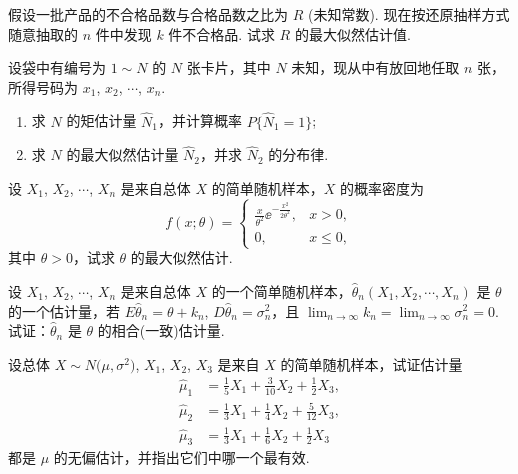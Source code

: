 	\begin{titwo}
		假设一批产品的不合格品数与合格品数之比为 $R$ (未知常数). 现在按还原抽样方式随意抽取的 $n$ 件中发现 $k$ 件不合格品. 试求 $R$ 的最大似然估计值.
	\end{titwo}

	\begin{titwo}
		设袋中有编号为 $1 \sim N$ 的 $N$ 张卡片，其中 $N$ 未知，现从中有放回地任取 $n$ 张，所得号码为 $x_{1}$, $x_{2}$, $\cdots$, $x_{n}$.
		\begin{enumerate}
			\item 求 $N$ 的矩估计量 $\hat N_{1}$，并计算概率 $P\bigl\{ \hat N_{1} = 1 \bigr\}$;
			\item 求 $N$ 的最大似然估计量 $\hat N_{2}$，并求 $\hat N_{2}$ 的分布律.
		\end{enumerate}
	\end{titwo}

	\begin{titwo}
		设 $X_{1}$, $X_{2}$, $\cdots$, $X_{n}$ 是来自总体 $X$ 的简单随机样本，$X$ 的概率密度为
		\[
			f(x;\theta) = \begin{cases}
				\frac{x}{\theta^{2}} \ee^{ - \frac{x^{2}}{2 \theta^{2}} }, & x > 0, \\
				0, & x \leq 0,
			\end{cases}
		\]
		其中 $\theta > 0$，试求 $\theta$ 的最大似然估计.
	\end{titwo}

	\begin{titwo}
		设 $X_{1}$, $X_{2}$, $\cdots$, $X_{n}$ 是来自总体 $X$ 的一个简单随机样本，$\hat \theta_{n}(X_{1},X_{2},\cdots,X_{n})$ 是 $\theta$ 的一个估计量，若 $E\hat \theta_{n} = \theta + k_{n}$, $D\hat \theta_{n} = \sigma_{n}^{2}$，且 $\lim_{n \to \infty} k_{n} = \lim_{n \to \infty} \sigma_{n}^{2} = 0$. 试证：$\hat \theta_{n}$ 是 $\theta$ 的相合(一致)估计量.
	\end{titwo}

	\begin{titwo}
		设总体 $X \sim N\bigl( \mu,\sigma^{2} \bigr)$, $X_{1}$, $X_{2}$, $X_{3}$ 是来自 $X$ 的简单随机样本，试证估计量
		\begin{align*}
			\hat \mu_{1} &= \frac{1}{5} X_{1} + \frac{3}{10} X_{2} + \frac{1}{2} X_{3}, \\
			\hat \mu_{2} &= \frac{1}{3} X_{1} + \frac{1}{4} X_{2} + \frac{5}{12} X_{3}, \\
			\hat \mu_{3} &= \frac{1}{3} X_{1} + \frac{1}{6} X_{2} + \frac{1}{2} X_{3}
		\end{align*}
		都是 $\mu$ 的无偏估计，并指出它们中哪一个最有效.
	\end{titwo}


